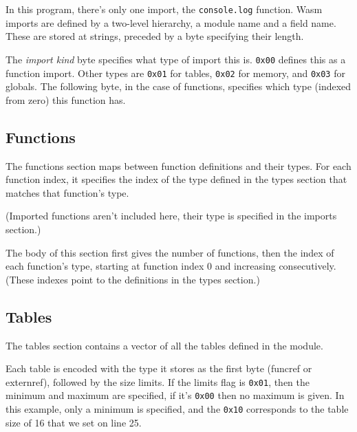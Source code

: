 \documentclass[10pt,a4paper]{article}
\newcommand{\hex}[1]{\texttt{#1}}
\begin{document}
In this program, there's only one import, the \texttt{console.log} function. Wasm imports are defined by a two-level hierarchy, a module name and a field name. These are stored at strings, preceded by a byte specifying their length.

The \textit{import kind} byte specifies what type of import this is. \texttt{0x00} defines this as a function import. Other types are \texttt{0x01} for tables, \texttt{0x02} for memory, and \texttt{0x03} for globals. The following byte, in the case of functions, specifies which type (indexed from zero) this function has.




\subsection*{Functions}

The functions section maps between function definitions and their types. For each function index, it specifies the index of the type defined in the types section that matches that function's type.

(Imported functions aren't included here, their type is specified in the imports section.)



The body of this section first gives the number of functions, then the index of each function's type, starting at function index 0 and increasing consecutively. (These indexes point to the definitions in the types section.)




\subsection*{Tables}

The tables section contains a vector of all the tables defined in the module.



Each table is encoded with the type it stores as the first byte (\textsf{funcref} or \textsf{externref}), followed by the size limits. If the limits flag is \hex{0x01}, then the minimum and maximum are specified, if it's \hex{0x00} then no maximum is given. In this example, only a minimum is specified, and the \hex{0x10} corresponds to the table size of 16 that we set on line 25.
\end{document}
